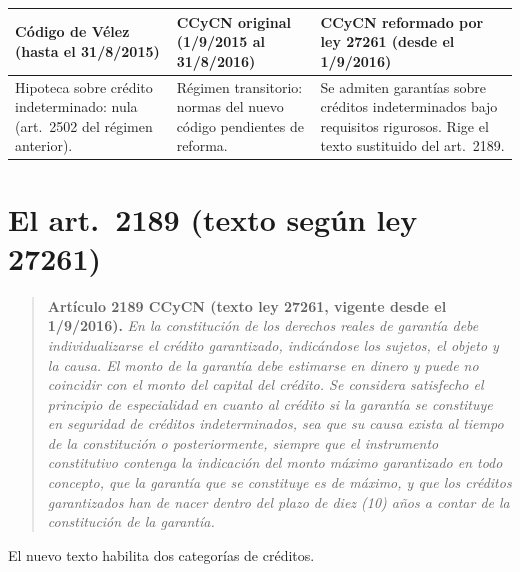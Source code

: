 \documentclass[12pt,oneside]{book}
\begin{document}
\begin{table}[H]
\centering
\begin{tabularx}{\textwidth}{L L L}
\toprule
\textbf{Código de Vélez (hasta el 31/8/2015)} & \textbf{CCyCN original (1/9/2015 al 31/8/2016)} & \textbf{CCyCN reformado por ley 27261 (desde el 1/9/2016)} \\
\midrule
Hipoteca sobre crédito indeterminado: nula (art.~2502 del régimen anterior). &
Régimen transitorio: normas del nuevo código pendientes de reforma. &
Se admiten garantías sobre créditos indeterminados bajo requisitos rigurosos. Rige el texto sustituido del art.~2189. \\
\bottomrule
\end{tabularx}
\end{table}

\section{El art.~2189 (texto según ley 27261)}

\begin{quote}
\textbf{Artículo 2189 CCyCN (texto ley 27261, vigente desde el 1/9/2016).} \textit{En la constitución de los derechos reales de garantía debe individualizarse el crédito garantizado, indicándose los sujetos, el objeto y la causa. El monto de la garantía debe estimarse en dinero y puede no coincidir con el monto del capital del crédito. Se considera satisfecho el principio de especialidad en cuanto al crédito si la garantía se constituye en seguridad de créditos indeterminados, sea que su causa exista al tiempo de la constitución o posteriormente, siempre que el instrumento constitutivo contenga la indicación del monto máximo garantizado en todo concepto, que la garantía que se constituye es de máximo, y que los créditos garantizados han de nacer dentro del plazo de diez (10) años a contar de la constitución de la garantía.}
\end{quote}

El nuevo texto habilita dos categorías de créditos.
\end{document}
